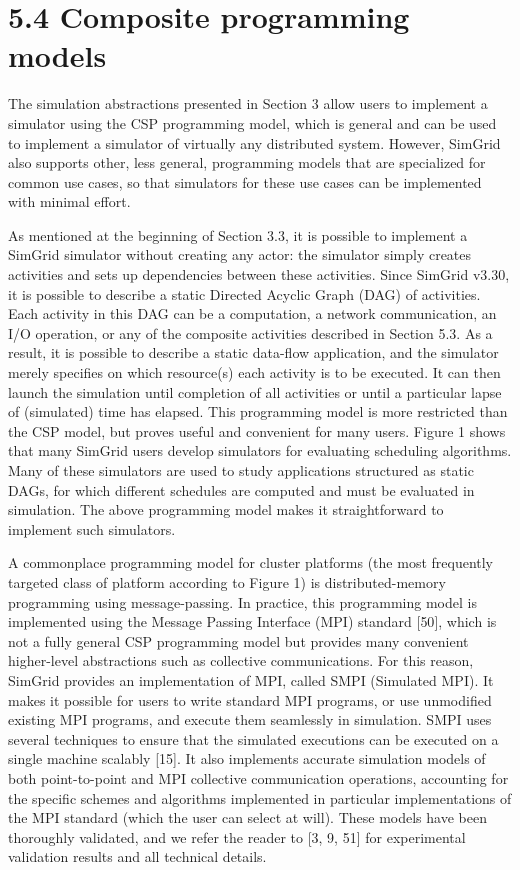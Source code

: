 \documentclass[
]{article}
\begin{document}
\section{5.4 Composite programming
models}\label{composite-programming-models}

The simulation abstractions presented in Section 3 allow users to
implement a simulator using the CSP programming model, which is general
and can be used to implement a simulator of virtually any distributed
system. However, SimGrid also supports other, less general, programming
models that are specialized for common use cases, so that simulators for
these use cases can be implemented with minimal effort.

As mentioned at the beginning of Section 3.3, it is possible to
implement a SimGrid simulator without creating any actor: the simulator
simply creates activities and sets up dependencies between these
activities. Since SimGrid v3.30, it is possible to describe a static
Directed Acyclic Graph (DAG) of activities. Each activity in this DAG
can be a computation, a network communication, an I/O operation, or any
of the composite activities described in Section 5.3. As a result, it is
possible to describe a static data-flow application, and the simulator
merely specifies on which resource(s) each activity is to be executed.
It can then launch the simulation until completion of all activities or
until a particular lapse of (simulated) time has elapsed. This
programming model is more restricted than the CSP model, but proves
useful and convenient for many users. Figure 1 shows that many SimGrid
users develop simulators for evaluating scheduling algorithms. Many of
these simulators are used to study applications structured as static
DAGs, for which different schedules are computed and must be evaluated
in simulation. The above programming model makes it straightforward to
implement such simulators.

A commonplace programming model for cluster platforms (the most
frequently targeted class of platform according to Figure 1) is
distributed-memory programming using message-passing. In practice, this
programming model is implemented using the Message Passing Interface
(MPI) standard {[}50{]}, which is not a fully general CSP programming
model but provides many convenient higher-level abstractions such as
collective communications. For this reason, SimGrid provides an
implementation of MPI, called SMPI (Simulated MPI). It makes it possible
for users to write standard MPI programs, or use unmodified existing MPI
programs, and execute them seamlessly in simulation. SMPI uses several
techniques to ensure that the simulated executions can be executed on a
single machine scalably {[}15{]}. It also implements accurate simulation
models of both point-to-point and MPI collective communication
operations, accounting for the specific schemes and algorithms
implemented in particular implementations of the MPI standard (which the
user can select at will). These models have been thoroughly validated,
and we refer the reader to {[}3, 9, 51{]} for experimental validation
results and all technical details.
\end{document}

